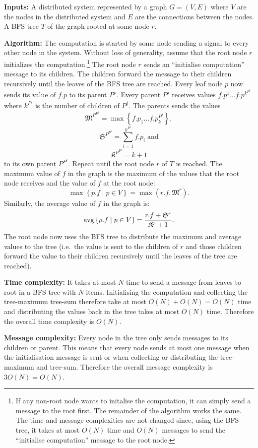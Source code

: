 \documentclass[a4paper,onecolumn,oneside]{article}
\DeclareMathOperator{\avg}{avg}
\begin{document}
\textbf{Inputs:}  A distributed system represented by a graph $G=(V,E)$ where
$V$ are the nodes in the distributed system and $E$ are the connections between
the nodes.  A BFS tree $T$ of the graph rooted at some node $r$.

\textbf{Algorithm:}  The computation is started by some node sending a signal to
every other node in the system.  Without loss of generality, assume that the
root node $r$ initializes the computation.\footnote{If any non-root node wants
to initalise the computation, it can simply send a message to the root first.
The remainder of the algorithm works the same.  The time and message
complexities are not changed since, using the BFS tree, it takes at most $O(N)$
time and $O(N)$ messages to send the ``initialise computation'' message to the
root node.}  The root node $r$ sends an ``initialise computation'' message to
its children.  The children forward the message to their children recursively
until the leaves of the BFS tree are reached.  Every leaf node $p$ now sends its
value of $f.p$ to its parent $P^p$.  Every parent $P^j$ receives values
$f.p^1\ldots f.p^{k^{P^j}}$ where $k^{P^j}$ is the number of children of $P^j$.
The parents sends the values
$$\mathfrak{M}^{P^{P^j}} = \max\left\{f.p_1\ldots f.p_k^{P^j}\right\},$$
$$\mathfrak{S}^{P^{P^j}} = \sum\limits_{i=1}^{k^{P^j}} f.p_i\;\mathrm{and}$$
$$\mathfrak{K}^{P^{P^j}} = k + 1$$
to its own parent $P^{P^j}$.
Repeat until the root node $r$ of $T$ is reached.  The maximum value of $f$ in
the graph is the maximum of the values that the root node receives and the value
of $f$ at the root node:
$$\max\left\{p.f \mid p \in V\right\} = \max(r.f, \mathfrak{M}^r).$$
Similarly, the average value
of $f$ in the graph is:
$$\avg\left\{p.f \mid p \in V\right\} = {r.f + \mathfrak{S}^r \over \mathfrak{K}^r + 1}.$$
The root node now uses the BFS tree to distribute the maximum and average values
to the tree (i.e.\ the value is sent to the children of $r$ and those children
forward the value to their children recursively until the leaves of the tree are
reached).

\textbf{Time complexity:}  It takes at most $N$ time to send a message from
leaves to root in a BFS tree with $N$ items.  Initialising the computation and
collecting the tree-maximum tree-sum therefore take at most $O(N) + O(N) = O(N)$
time and distributing the values back in the tree takes at most $O(N)$ time.
Therefore the overall time complexity is $O(N)$.

\textbf{Message complexity:}  Every node in the tree only sends messages to its
children or parent.  This means that every node sends at most one message when
the initialisation message is sent or when collecting or distributing the
tree-maximum and tree-sum.  Therefore the overall message complexity is $3O(N) =
O(N)$.
\end{document}
